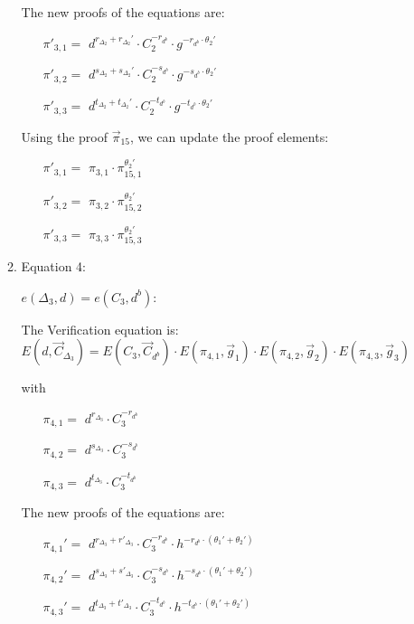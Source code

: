 \begin{description}
\begin{enumerate}
\begin{enumerate}
      The new proofs of the equations are:
      
      \begin{itemize}
      \item[$\pi'_{3,1} = $] $d^{r_{\Delta_2} + r_{\Delta_2}'} \cdot C_2^{-r_{d^b}} \cdot g^{-r_{d^b} \cdot \theta_2'}$    
      \item[$\pi'_{3,2} = $] $d^{s_{\Delta_2} + s_{\Delta_2}'} \cdot C_2^{-s_{d^b}} \cdot g^{-s_{d^b} \cdot \theta_2'}$    
      \item[$\pi'_{3,3} = $] $d^{t_{\Delta_2} + t_{\Delta_2}'} \cdot C_2^{-t_{d^b}} \cdot g^{-t_{d^b} \cdot \theta_2'}$
      \end{itemize}

      Using the proof $\vec{\pi}_{15}$, we can update the proof elements:

      \begin{itemize}
      \item[$\pi'_{3,1} = $] $\pi_{3,1} \cdot \pi_{15,1}^{\theta_2'}$    
      \item[$\pi'_{3,2} = $] $\pi_{3,2} \cdot \pi_{15,2}^{\theta_2'}$    
      \item[$\pi'_{3,3} = $] $\pi_{3,3} \cdot \pi_{15,3}^{\theta_2'}$
      \end{itemize}


      
    \item Equation 4:

      $e(\boxed{\Delta_3},d) = e(C_3, \boxed{d^b})$:
      
      The Verification equation is:  $E(d, \vec{C}_{\Delta_3}) = E(C_3, \vec{C}_{d^b}) \cdot E(\pi_{4,1}, \vec{g}_1)\cdot E(\pi_{4,2}, \vec{g}_2)\cdot E(\pi_{4,3}, \vec{g}_3)$
      
      with
      \begin{itemize}
      \item[$\pi_{4,1} = $] $d^{r_{\Delta_3}} \cdot C_3^{-r_{d^b}}$
      \item[$\pi_{4,2} = $] $d^{s_{\Delta_3}} \cdot C_3^{-s_{d^b}}$
      \item[$\pi_{4,3} = $] $d^{t_{\Delta_3}} \cdot C_3^{-t_{d^b}}$
      \end{itemize}

      The new proofs of the equations are:
      \begin{itemize}
      \item[$\pi_{4,1}' = $] $d^{r_{\Delta_3} + r'_{\Delta_3}} \cdot C_3^{-r_{d^b}} \cdot h^{- r_{d^b} \cdot (\theta_1'+ \theta_2')}$
      \item[$\pi_{4,2}' = $] $d^{s_{\Delta_3} + s'_{\Delta_3}} \cdot C_3^{-s_{d^b}} \cdot h^{- s_{d^b} \cdot (\theta_1'+ \theta_2')}$
      \item[$\pi_{4,3}' = $] $d^{t_{\Delta_3} + t'_{\Delta_3}} \cdot C_3^{-t_{d^b}} \cdot h^{- t_{d^b} \cdot (\theta_1'+ \theta_2')}$  
      \end{itemize}
      

\end{enumerate}
\end{enumerate}
\end{description}
